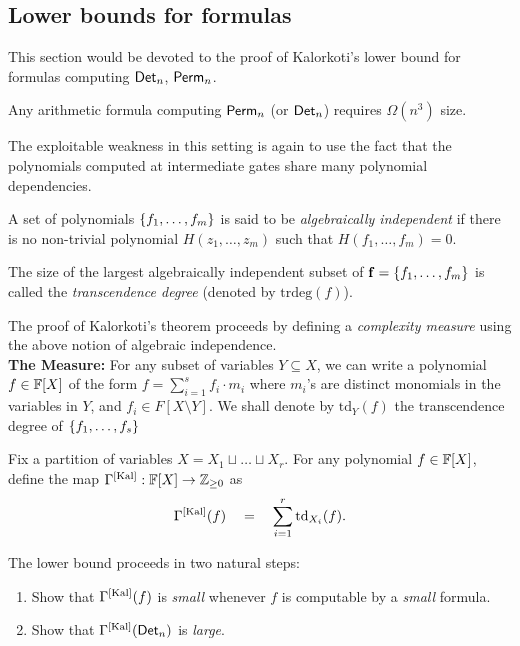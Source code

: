 \subsection{Lower bounds for formulas}\label{sec:Kalorkoti}

This section would be devoted to the proof of Kalorkoti's lower bound
\cite{k85} for formulas computing $\mathsf{Det}_n$, $\mathsf{Perm}_n$.

\begin{theorem}[\cite{k85}]\label{thm:kalorkoti}
  Any arithmetic formula computing $\mathsf{Perm}_n$ (or $\mathsf{Det}_n$) requires
  $\Omega(n^3)$ size.
\end{theorem}

The exploitable weakness in this setting is again to use the fact that the polynomials computed at intermediate gates share many polynomial dependencies. 

\begin{definition}
  A set of polynomials $\left\{f_1,\dots, f_m\right\}$ is said to be
  \emph{algebraically independent} if there is no non-trivial polynomial 
  $H(z_1,\dots, z_m)$ such that $H(f_1,\dots, f_m)=0$. 

  The size of the largest algebraically independent subset of
  $\mathbf{f}=\left\{f_1,\dots, f_m\right\}$ is called the \emph{transcendence
    degree} (denoted by $\mathrm{trdeg}(f)$).
\end{definition}

The proof of Kalorkoti's theorem proceeds by defining a \emph{complexity measure} using the above notion of algebraic independence. \\


{\bf The Measure:} 
For any subset of variables $Y\subseteq X$, we can write a polynomial
$f \in \mathbb{F}[X]$ of the form $f = \sum_{i=1}^s f_i \cdot m_i$ where $m_i$'s are
distinct monomials in the variables in $Y$, and $f_i \in
F[X \setminus Y]$. We shall denote by $\mathrm{td}_Y(f)$ the transcendence degree of $\left\{f_1,\dots, f_s\right\}$


Fix a partition of variables $X = X_1 \sqcup \dots
\sqcup X_r$. For any polynomial $f\in \mathbb{F}[X]$, define the map $\Gamma^{\mathrm{[Kal]}}:\mathbb{F}[X]\rightarrow \mathbb{Z}_{\geq 0}$  as
$$
\Gamma^{\mathrm{[Kal]}}(f) \quad=\quad \sum_{i=1}^r \mathrm{td}_{X_i}(f).
$$

The lower bound proceeds in two natural steps:
\begin{enumerate}
\item Show that $\Gamma^{\mathrm{[Kal]}}(f)$ is \emph{small} whenever $f$ is computable by a \emph{small} formula. 
\item Show that $\Gamma^{\mathrm{[Kal]}}(\mathsf{Det}_n)$ is \emph{large}. 
\end{enumerate}

